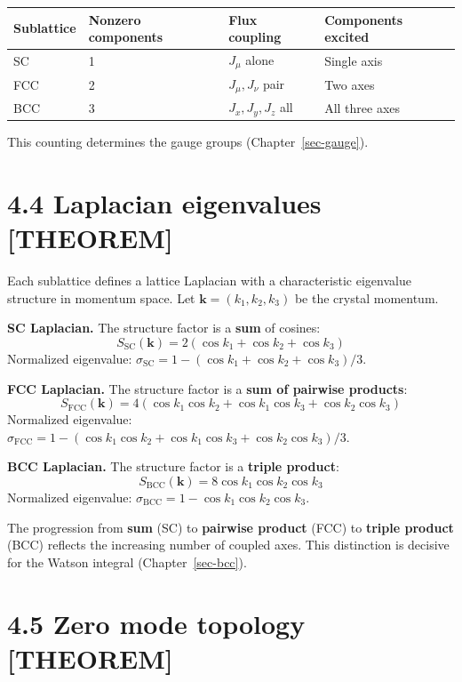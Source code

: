 \documentclass[
  11pt,
  letterpaper,
  twoside,
  openright]{book}
\begin{document}
\begin{longtable}[]{@{}llll@{}}
\toprule\noalign{}
Sublattice & Nonzero components & Flux coupling & Components excited \\
\midrule\noalign{}
\endhead
\bottomrule\noalign{}
\endlastfoot
SC & 1 & \(J_\mu\) alone & Single axis \\
FCC & 2 & \(J_\mu, J_\nu\) pair & Two axes \\
BCC & 3 & \(J_x, J_y, J_z\) all & All three axes \\
\end{longtable}

This counting determines the gauge groups (Chapter~\ref{sec-gauge}).

\section{4.4 Laplacian eigenvalues
{[}THEOREM{]}}\label{laplacian-eigenvalues-theorem}

Each sublattice defines a lattice Laplacian with a characteristic
eigenvalue structure in momentum space. Let
\(\mathbf{k} = (k_1, k_2, k_3)\) be the crystal momentum.

\textbf{SC Laplacian.} The structure factor is a \textbf{sum} of
cosines: \[
S_{\text{SC}}(\mathbf{k}) = 2(\cos k_1 + \cos k_2 + \cos k_3)
\] Normalized eigenvalue:
\(\sigma_{\text{SC}} = 1 - (\cos k_1 + \cos k_2 + \cos k_3)/3\).

\textbf{FCC Laplacian.} The structure factor is a \textbf{sum of
pairwise products}: \[
S_{\text{FCC}}(\mathbf{k}) = 4(\cos k_1 \cos k_2 + \cos k_1 \cos k_3 + \cos k_2 \cos k_3)
\] Normalized eigenvalue:
\(\sigma_{\text{FCC}} = 1 - (\cos k_1 \cos k_2 + \cos k_1 \cos k_3 + \cos k_2 \cos k_3)/3\).

\textbf{BCC Laplacian.} The structure factor is a \textbf{triple
product}: \[
S_{\text{BCC}}(\mathbf{k}) = 8 \cos k_1 \cos k_2 \cos k_3
\] Normalized eigenvalue:
\(\sigma_{\text{BCC}} = 1 - \cos k_1 \cos k_2 \cos k_3\).

The progression from \textbf{sum} (SC) to \textbf{pairwise product}
(FCC) to \textbf{triple product} (BCC) reflects the increasing number of
coupled axes. This distinction is decisive for the Watson integral
(Chapter~\ref{sec-bcc}).

\section{4.5 Zero mode topology
{[}THEOREM{]}}\label{zero-mode-topology-theorem}
\end{document}
